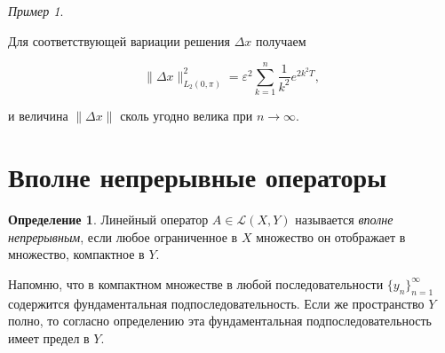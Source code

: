 \documentclass[12pt,a4paper,titlepage,oneside]{book}
\theoremstyle{definition}
\newtheorem*{definition}{Определение}
\theoremstyle{plain}
\theoremstyle{break}
\theoremstyle{remark}
\theoremstyle{remark}
\newtheorem*{example}{Пример}
\theoremstyle{remark}
\theoremstyle{remark}
\theoremstyle{plain}
\theoremstyle{plain}
\begin{document}
\begin{example}
\begin{enumerate}
Для соответствующей вариации решения $\Delta x$ получаем
\begin{center}
$$\| \Delta x \|_{L_2(0, \pi)}^2 = \varepsilon ^2 \sum\limits_{k=1}^n \frac{1}{k^2} e^{2 k^2 T},$$
\end{center}
и величина $\| \Delta x \|$ сколь угодно велика при $n \longrightarrow \infty.$

\end{enumerate}

\end{example}

\section{Вполне непрерывные операторы}
\begin{definition}Линейный оператор $A \in \mathcal{L}(X, Y)$ называется \textit{вполне непрерывным}, если любое ограниченное в $X$ множество он отображает в множество, компактное в $Y$.
\end{definition}
Напомню, что в компактном множестве в любой последовательности $\lbrace y_n \rbrace_{n=1}^{\infty}$ содержится фундаментальная подпоследовательность. Если же пространство $Y$ полно, то согласно определению эта фундаментальная подпоследовательность имеет предел в $Y$.
\end{document}

